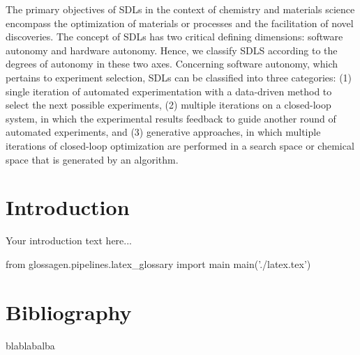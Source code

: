 \documentclass{article}
\begin{document}
The primary objectives of SDLs in the context of chemistry and materials science encompass the optimization of materials or processes and the facilitation of novel discoveries. The concept of SDLs has two critical defining dimensions: software autonomy and hardware autonomy. Hence, we classify SDLS according to the degrees of autonomy in these two axes.
Concerning software autonomy, which pertains to experiment selection, SDLs can be classified into three categories: (1) single iteration of automated experimentation with a data-driven method to select the next possible experiments, (2) multiple iterations on a closed-loop system, in which the experimental results feedback to guide another round of automated experiments, and (3) generative approaches, in which multiple iterations of closed-loop optimization are performed in a search space or chemical space that is generated by an algorithm.


\section{Introduction}
Your introduction text here...


\begin{pycode}
from glossagen.pipelines.latex_glossary import main
main('./latex.tex')
\end{pycode}

\section*{Bibliography}
blablabalba
\end{document}
